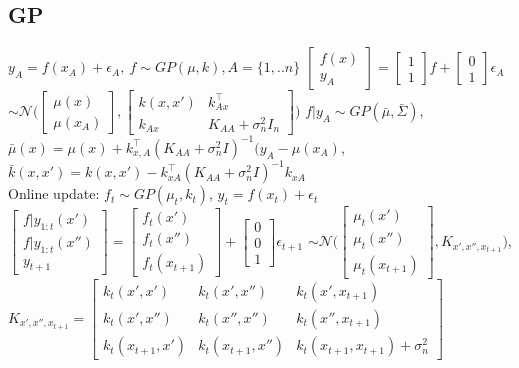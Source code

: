 \subsection{GP}
$y_{A}=f(x_{A})+\epsilon_{A},\ f\sim GP(\mu, k), A=\{1,..n\}$
$\begin{bmatrix} f(x) \\ y_{A}\end{bmatrix} = \begin{bmatrix} 1 \\ 1\end{bmatrix} f + \begin{bmatrix} 0 \\ 1 \end{bmatrix}\epsilon_{A}$
$\sim \mathcal{N}\big( \begin{bmatrix} \mu(x) \\ \mu(x_{A})\end{bmatrix},
    \begin{bmatrix} k(x,x') & k_{Ax}^{\top} \\ k_{Ax} & K_{AA}+\sigma_{n}^{2}I_{n}\end{bmatrix} \big)$
$f|y_{A} \sim GP(\bar{\mu}, \bar{\Sigma})$,
$\bar{\mu}(x) = \mu(x) + k_{x,A}^{\top}(K_{AA}+\sigma_{n}^{2}I)^{-1}(y_{A}-\mu(x_{A})$,
$\bar{k}(x,x')= k(x,x')-k_{xA}^{\top}(K_{AA}+\sigma_{n}^{2}I)^{-1}k_{xA}$\\
Online update:
$f_{t} \sim GP(\mu_{t}, k_{t})$, $y_{t}=f(x_{t})+\epsilon_{t}$
$\begin{bmatrix} f|y_{1:t}(x') \\ f|y_{1:t}(x'')\\ y_{t+1}\end{bmatrix} =
\begin{bmatrix} f_{t}(x') \\ f_{t}(x'') \\ f_{t}(x_{t+1}) \end{bmatrix} +
\begin{bmatrix} 0 \\ 0 \\ 1 \end{bmatrix}\epsilon_{t+1}$
$\sim \mathcal{N}\big(\begin{bmatrix} \mu_{t}(x') \\ \mu_{t}(x'') \\ \mu_{t}(x_{t+1}) \end{bmatrix}, K_{x',x'',x_{t+1}} \big)$,
$K_{x',x'',x_{t+1}} = \begin{bmatrix} k_{t}(x',x') & k_{t}(x',x'') & k_{t}(x',x_{t+1})\\
    k_{t}(x',x'') & k_{t}(x'',x'') & k_{t}(x'',x_{t+1}) \\
    k_{t}(x_{t+1},x') & k_{t}(x_{t+1},x'') & k_{t}(x_{t+1},x_{t+1})+\sigma_{n}^{2}\end{bmatrix}$


